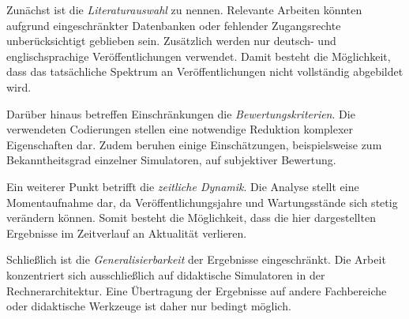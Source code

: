 Zunächst ist die \textit{Literaturauswahl} zu nennen. Relevante Arbeiten könnten aufgrund eingeschränkter Datenbanken oder fehlender Zugangsrechte unberücksichtigt geblieben sein. Zusätzlich werden nur deutsch- und englischsprachige Veröffentlichungen verwendet. Damit besteht die Möglichkeit, dass das tatsächliche Spektrum an Veröffentlichungen nicht vollständig abgebildet wird.

Darüber hinaus betreffen Einschränkungen die \textit{Bewertungskriterien}. Die verwendeten Codierungen stellen eine notwendige Reduktion komplexer Eigenschaften dar. Zudem beruhen einige Einschätzungen, beispielsweise zum Bekanntheitsgrad einzelner Simulatoren, auf subjektiver Bewertung.

Ein weiterer Punkt betrifft die \textit{zeitliche Dynamik}. Die Analyse stellt eine Momentaufnahme dar, da Veröffentlichungsjahre und Wartungsstände sich stetig verändern können. Somit besteht die Möglichkeit, dass die hier dargestellten Ergebnisse im Zeitverlauf an Aktualität verlieren.

Schließlich ist die \textit{Generalisierbarkeit} der Ergebnisse eingeschränkt. Die Arbeit konzentriert sich ausschließlich auf didaktische Simulatoren in der Rechnerarchitektur. Eine Übertragung der Ergebnisse auf andere Fachbereiche oder didaktische Werkzeuge ist daher nur bedingt möglich.
